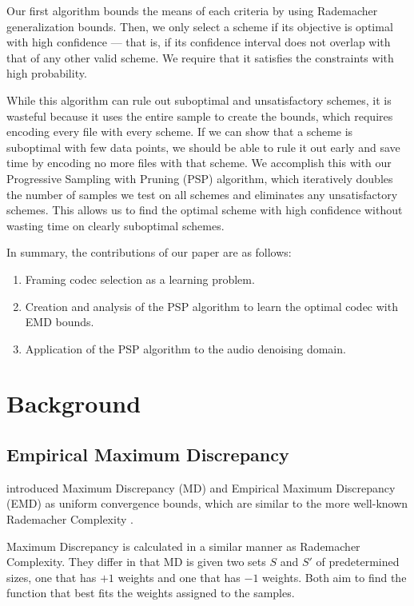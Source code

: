 \documentclass{article}
\begin{document}
Our first algorithm bounds the means of each criteria by using Rademacher generalization bounds. Then, we only select a scheme if its objective is optimal with high confidence --- that is, if its confidence interval does not overlap with that of any other valid scheme. We require that it satisfies the constraints with high probability.

While this algorithm can rule out suboptimal and unsatisfactory schemes, it is wasteful because it uses the entire sample to create the bounds, which requires encoding every file with every scheme. If we can show that a scheme is suboptimal with few data points, we should be able to rule it out early and save time by encoding no more files with that scheme. We accomplish this with our Progressive Sampling with Pruning (PSP) algorithm, which iteratively doubles the number of samples we test on all schemes and eliminates any unsatisfactory schemes. This allows us to find the optimal scheme with high confidence without wasting time on clearly suboptimal schemes.

In summary, the contributions of our paper are as follows:
\begin{enumerate}[wide, labelwidth=!, labelindent=0pt]
\setlength{\itemsep}{0pt}
\setlength{\parskip}{0pt}
\item Framing codec selection as a learning problem.
\item Creation and analysis of the PSP algorithm to learn the optimal codec with EMD bounds.
\item Application of the PSP algorithm to the audio denoising domain.
\end{enumerate}

\section{Background}

\subsection{Empirical Maximum Discrepancy}
\cite{bartlett-emd} introduced Maximum Discrepancy (MD) and Empirical Maximum Discrepancy (EMD) as uniform convergence bounds, which are similar to the more well-known Rademacher Complexity \citep{bartlett-rademacher}. 

Maximum Discrepancy is calculated in a similar manner as Rademacher Complexity. They differ in that MD is given two sets $S$ and $S'$ of predetermined sizes, one that has $+1$ weights and one that has $-1$ weights. Both aim to find the function that best fits the weights assigned to the samples.
\end{document}
